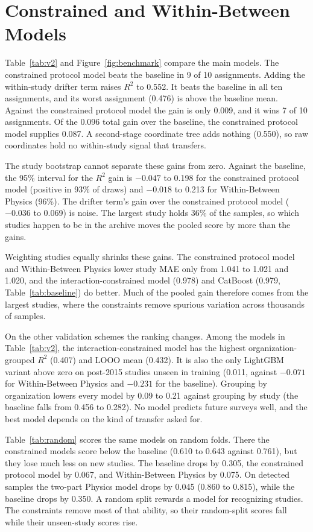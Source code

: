\documentclass[12pt,a4paper]{report}
\newcommand{\Rsq}{$R^2$}
\begin{document}
\section{Constrained and Within-Between Models}

Table~\ref{tab:v2} and Figure~\ref{fig:benchmark} compare the main models. The constrained protocol model beats the baseline in 9 of 10 assignments. Adding the within-study drifter term raises \Rsq{} to 0.552. It beats the baseline in all ten assignments, and its worst assignment (0.476) is above the baseline mean. Against the constrained protocol model the gain is only 0.009, and it wins 7 of 10 assignments. Of the 0.096 total gain over the baseline, the constrained protocol model supplies 0.087. A second-stage coordinate tree adds nothing (0.550), so raw coordinates hold no within-study signal that transfers.

The study bootstrap cannot separate these gains from zero. Against the baseline, the 95\% interval for the \Rsq{} gain is $-0.047$ to 0.198 for the constrained protocol model (positive in 93\% of draws) and $-0.018$ to 0.213 for Within-Between Physics (96\%). The drifter term's gain over the constrained protocol model ($-0.036$ to 0.069) is noise. The largest study holds 36\% of the samples, so which studies happen to be in the archive moves the pooled score by more than the gains.

Weighting studies equally shrinks these gains. The constrained protocol model and Within-Between Physics lower study MAE only from 1.041 to 1.021 and 1.020, and the interaction-constrained model (0.978) and CatBoost (0.979, Table~\ref{tab:baseline}) do better. Much of the pooled gain therefore comes from the largest studies, where the constraints remove spurious variation across thousands of samples.

On the other validation schemes the ranking changes. Among the models in Table~\ref{tab:v2}, the interaction-constrained model has the highest organization-grouped \Rsq{} (0.407) and LOOO mean (0.432). It is also the only LightGBM variant above zero on post-2015 studies unseen in training (0.011, against $-0.071$ for Within-Between Physics and $-0.231$ for the baseline). Grouping by organization lowers every model by 0.09 to 0.21 against grouping by study (the baseline falls from 0.456 to 0.282). No model predicts future surveys well, and the best model depends on the kind of transfer asked for.

Table~\ref{tab:random} scores the same models on random folds. There the constrained models score below the baseline (0.610 to 0.643 against 0.761), but they lose much less on new studies. The baseline drops by 0.305, the constrained protocol model by 0.067, and Within-Between Physics by 0.075. On detected samples the two-part Physics model drops by 0.045 (0.860 to 0.815), while the baseline drops by 0.350. A random split rewards a model for recognizing studies. The constraints remove most of that ability, so their random-split scores fall while their unseen-study scores rise.
\end{document}
